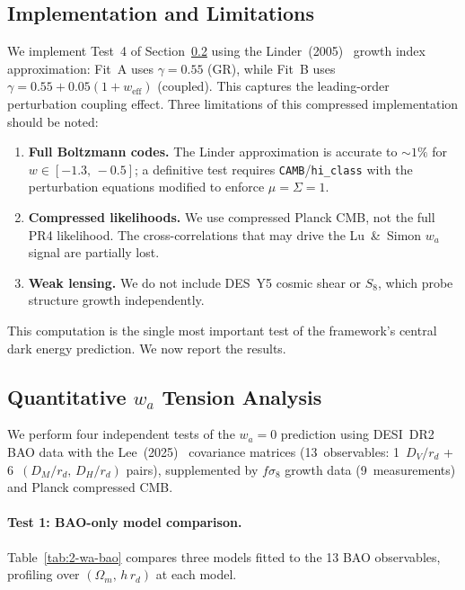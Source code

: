 \subsection{Implementation and Limitations}
\label{sec:2-decoupled-why}

We implement Test~4 of Section~\ref{sec:2-constant-w-vs-CPL} using the Linder~(2005)~\cite{ch2:Linder2005} growth index approximation: Fit~A uses $\gamma = 0.55$ (GR), while Fit~B uses $\gamma = 0.55 + 0.05(1 + w_\mathrm{eff})$ (coupled). This captures the leading-order perturbation coupling effect. Three limitations of this compressed implementation should be noted:
\begin{enumerate}
\item \textbf{Full Boltzmann codes.} The Linder approximation is accurate to ${\sim}1\%$ for $w \in [-1.3,\,-0.5]$; a definitive test requires \texttt{CAMB}/\texttt{hi\_class} with the perturbation equations modified to enforce $\mu = \Sigma = 1$.
\item \textbf{Compressed likelihoods.} We use compressed Planck CMB, not the full PR4 likelihood. The cross-correlations that may drive the Lu~\&~Simon $w_a$ signal are partially lost.
\item \textbf{Weak lensing.} We do not include DES~Y5 cosmic shear or $S_8$, which probe structure growth independently.
\end{enumerate}

This computation is the single most important test of the framework's central dark energy prediction. We now report the results.

\subsection{Quantitative $w_a$ Tension Analysis}
\label{sec:2-constant-w-vs-CPL}

We perform four independent tests of the $w_a = 0$ prediction using DESI~DR2 BAO data with the Lee~(2025)~\cite{ch2:Lee2025} covariance matrices (13~observables: 1~$D_V/r_d$ + 6~$(D_M/r_d,\,D_H/r_d)$ pairs), supplemented by $f\sigma_8$ growth data (9~measurements) and Planck compressed CMB.

\paragraph{Test 1: BAO-only model comparison.}
Table~\ref{tab:2-wa-bao} compares three models fitted to the 13 BAO observables, profiling over $(\Omega_m,\,h\,r_d)$ at each model.

